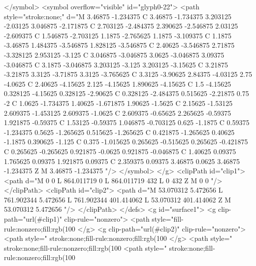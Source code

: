 </symbol>
<symbol overflow="visible" id="glyph0-22">
<path style="stroke:none;" d="M 3.46875 -1.234375 C 3.46875 -1.734375 3.203125 -2.03125 3.046875 -2.171875 C 2.703125 -2.484375 2.390625 -2.546875 2.03125 -2.609375 C 1.546875 -2.703125 1.1875 -2.765625 1.1875 -3.109375 C 1.1875 -3.46875 1.484375 -3.546875 1.828125 -3.546875 C 2.40625 -3.546875 2.71875 -3.328125 2.953125 -3.125 C 3.046875 -3.046875 3.0625 -3.046875 3.09375 -3.046875 C 3.1875 -3.046875 3.203125 -3.125 3.203125 -3.15625 C 3.21875 -3.21875 3.3125 -3.71875 3.3125 -3.765625 C 3.3125 -3.90625 2.84375 -4.03125 2.75 -4.0625 C 2.40625 -4.15625 2.125 -4.15625 1.890625 -4.15625 C 1.5 -4.15625 0.328125 -4.15625 0.328125 -2.90625 C 0.328125 -2.484375 0.515625 -2.21875 0.75 -2 C 1.0625 -1.734375 1.40625 -1.671875 1.90625 -1.5625 C 2.15625 -1.53125 2.609375 -1.453125 2.609375 -1.0625 C 2.609375 -0.65625 2.265625 -0.59375 1.921875 -0.59375 C 1.53125 -0.59375 1.046875 -0.703125 0.625 -1.1875 C 0.59375 -1.234375 0.5625 -1.265625 0.515625 -1.265625 C 0.421875 -1.265625 0.40625 -1.1875 0.390625 -1.125 C 0.375 -1.015625 0.265625 -0.515625 0.265625 -0.421875 C 0.265625 -0.265625 0.921875 -0.0625 0.921875 -0.046875 C 1.40625 0.09375 1.765625 0.09375 1.921875 0.09375 C 2.359375 0.09375 3.46875 0.0625 3.46875 -1.234375 Z M 3.46875 -1.234375 "/>
</symbol>
</g>
<clipPath id="clip1">
  <path d="M 0 0 L 864.011719 0 L 864.011719 432 L 0 432 Z M 0 0 "/>
</clipPath>
<clipPath id="clip2">
  <path d="M 53.070312 5.472656 L 761.902344 5.472656 L 761.902344 401.414062 L 53.070312 401.414062 Z M 53.070312 5.472656 "/>
</clipPath>
</defs>
<g id="surface1">
<g clip-path="url(#clip1)" clip-rule="nonzero">
<path style="fill-rule:nonzero;fill:rgb(100%
</g>
<g clip-path="url(#clip2)" clip-rule="nonzero">
<path style=" stroke:none;fill-rule:nonzero;fill:rgb(100%
</g>
<path style=" stroke:none;fill-rule:nonzero;fill:rgb(100%
<path style=" stroke:none;fill-rule:nonzero;fill:rgb(100%

